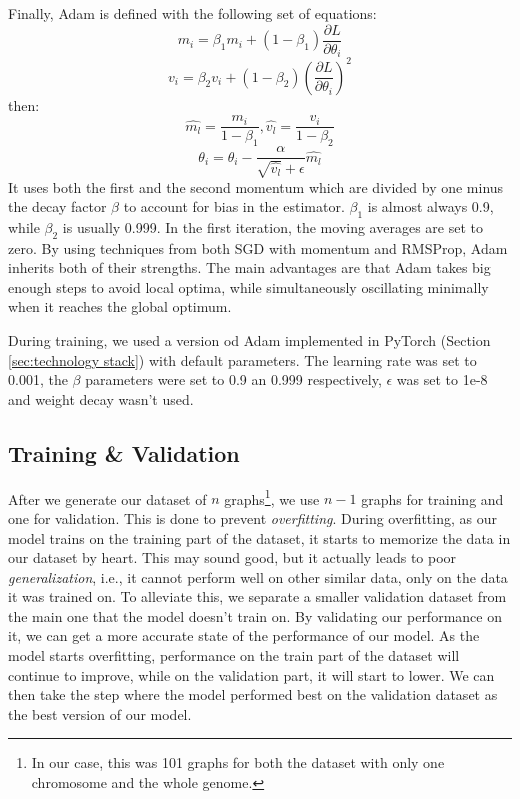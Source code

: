 \documentclass[times, utf8, diplomski, english]{fer_eng}
\begin{document}
Finally, Adam is defined with the following set of equations:
\[ m_i = \beta_1 m_i + (1 - \beta_1) \frac{\partial L}{\partial \theta_i} \]
\[ v_i = \beta_2 v_i + (1 - \beta_2) \left(\frac{\partial L}{\partial \theta_i}\right)^2 \]
then:
\[ \widehat{m_l} = \frac{m_i}{1 - \beta_1}, \widehat{v_l} = \frac{v_i}{1 - \beta_2} \]
\[ \theta_i = \theta_i - \frac{\alpha}{\sqrt{\widehat{v_l}} + \epsilon} \widehat{m_l} \]
It uses both the first and the second momentum which are divided by one minus the decay factor $\beta$ to account for bias in the estimator. $\beta_1$ is almost always 0.9, while $\beta_2$ is usually 0.999. In the first iteration, the moving averages are set to zero. By using techniques from both SGD with momentum and RMSProp, Adam inherits both of their strengths. The main advantages are that Adam takes big enough steps to avoid local optima, while simultaneously oscillating minimally when it reaches the global optimum.

During training, we used a version od Adam implemented in PyTorch (Section \ref{sec:technology stack}) with default parameters. The learning rate was set to 0.001, the $\beta$ parameters were set to 0.9 an 0.999 respectively, $\epsilon$ was set to 1e-8 and weight decay wasn't used.

\subsection{Training \& Validation}
\label{subsec:the training process}

After we generate our dataset of $n$ graphs\footnote{In our case, this was 101 graphs for both the dataset with only one chromosome and the whole genome.}, we use $n - 1$ graphs for training and one for validation. This is done to prevent \textit{overfitting}. During overfitting, as our model trains on the training part of the dataset, it starts to memorize the data in our dataset by heart. This may sound good, but it actually leads to poor \textit{generalization}, i.e., it cannot perform well on other similar data, only on the data it was trained on. To alleviate this, we separate a smaller validation dataset from the main one that the model doesn't train on. By validating our performance on it, we can get a more accurate state of the performance of our model. As the model starts overfitting, performance on the train part of the dataset will continue to improve, while on the validation part, it will start to lower. We can then take the step where the model performed best on the validation dataset as the best version of our model.
\end{document}
